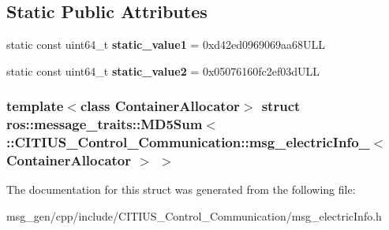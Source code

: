\subsection*{\-Static \-Public \-Attributes}
\begin{DoxyCompactItemize}
\item 
\hypertarget{structros_1_1message__traits_1_1_m_d5_sum_3_01_1_1_c_i_t_i_u_s___control___communication_1_1msg_20a1605dbd67ae3e89dfe57fef2b5cf4_a3384441eecc7bc66386cd2db8f54efd2}{static const uint64\-\_\-t {\bfseries static\-\_\-value1} = 0xd42ed0969069aa68\-U\-L\-L}\label{structros_1_1message__traits_1_1_m_d5_sum_3_01_1_1_c_i_t_i_u_s___control___communication_1_1msg_20a1605dbd67ae3e89dfe57fef2b5cf4_a3384441eecc7bc66386cd2db8f54efd2}

\item 
\hypertarget{structros_1_1message__traits_1_1_m_d5_sum_3_01_1_1_c_i_t_i_u_s___control___communication_1_1msg_20a1605dbd67ae3e89dfe57fef2b5cf4_a51e0576d9d633d42ee448f52b2a623fe}{static const uint64\-\_\-t {\bfseries static\-\_\-value2} = 0x05076160fc2ef03d\-U\-L\-L}\label{structros_1_1message__traits_1_1_m_d5_sum_3_01_1_1_c_i_t_i_u_s___control___communication_1_1msg_20a1605dbd67ae3e89dfe57fef2b5cf4_a51e0576d9d633d42ee448f52b2a623fe}

\end{DoxyCompactItemize}
\subsubsection*{template$<$class Container\-Allocator$>$ struct ros\-::message\-\_\-traits\-::\-M\-D5\-Sum$<$ \-::\-C\-I\-T\-I\-U\-S\-\_\-\-Control\-\_\-\-Communication\-::msg\-\_\-electric\-Info\-\_\-$<$ Container\-Allocator $>$ $>$}



\-The documentation for this struct was generated from the following file\-:\begin{DoxyCompactItemize}
\item 
msg\-\_\-gen/cpp/include/\-C\-I\-T\-I\-U\-S\-\_\-\-Control\-\_\-\-Communication/msg\-\_\-electric\-Info.\-h\end{DoxyCompactItemize}
